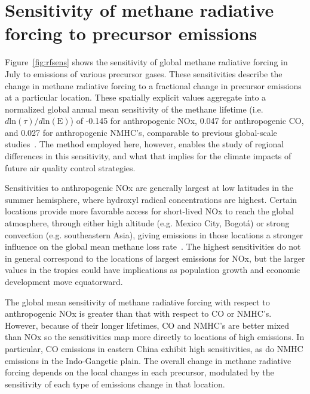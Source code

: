 \section{Sensitivity of methane radiative forcing to precursor emissions}

Figure~\ref{fig:rfsens} shows the sensitivity of global methane radiative forcing in July to emissions of various precursor gases. These sensitivities describe the change in methane radiative forcing to a fractional change in precursor emissions at a particular location. These spatially explicit values aggregate into a normalized global annual mean sensitivity of the methane lifetime (i.e. $d \mathrm{ln}(\tau)/d\mathrm{ln}(\mathrm{E})$) of -0.145 for anthropogenic NOx, 0.047 for anthropogenic CO, and 0.027 for anthropogenic NMHC's, comparable to previous global-scale studies~\citep{ref:fry2012,ref:holmes2013}. The method employed here, however, enables the study of regional differences in this sensitivity, and what that implies for the climate impacts of future air quality control strategies.


Sensitivities to anthropogenic NOx are generally largest at low latitudes in the summer hemisphere, where hydroxyl radical concentrations are highest. Certain locations provide more favorable access for short-lived NOx to reach the global atmosphere, through either high altitude (e.g. Mexico City, Bogot\'a) or strong convection (e.g. southeastern Asia), giving emissions in those locations a stronger influence on the global mean methane loss rate~\citep{ref:bowman2012}. The highest sensitivities do not in general correspond to the locations of largest emissions for NOx, but the larger values in the tropics could have implications as population growth and economic development move equatorward.


The global mean sensitivity of methane radiative forcing with respect to anthropogenic NOx is greater than that with respect to CO or NMHC's. However, because of their longer lifetimes, CO and NMHC's are better mixed than NOx so the sensitivities map more directly to locations of high emissions. In particular, CO emissions in eastern China exhibit high sensitivities, as do NMHC emissions in the Indo-Gangetic plain. The overall change in methane radiative forcing depends on the local changes in each precursor, modulated by the sensitivity of each type of emissions change in that location.

